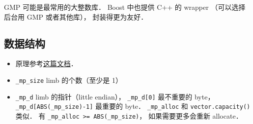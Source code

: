 
GMP 可能是最常用的大整数库． Boost 中也提供 C++ 的 wrapper （可以选择后台用 GMP 或者其他库）， 封装得更为友好．

\subsection{数据结构}
\begin{itemize}
\item 原理参考\href{https://gmplib.org/manual/Integer-Internals#Integer-Internals}{这篇文档}．
\item \verb|_mp_size| limb 的个数（至少是 1）
\item \verb|_mp_d| limb 的指针（little endian）， \verb|_mp_d[0]| 最不重要的 byte， \verb|_mp_d[ABS(_mp_size)-1]| 最重要的 byte．
\verb|_mp_alloc| 和 \verb|vector.capacity()| 类似． 有 \verb|_mp_alloc >= ABS(_mp_size)|， 如果需要更多会重新 allocate．
\end{itemize}


